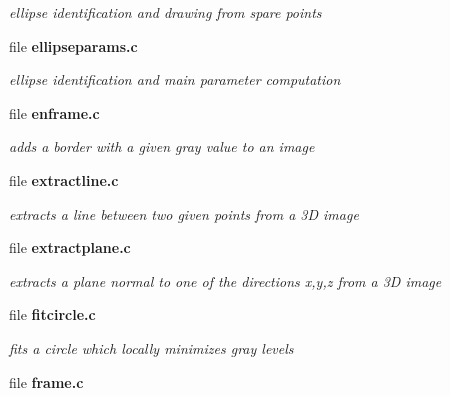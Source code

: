 \begin{DoxyCompactItemize}
\begin{DoxyCompactList}\small\item\em ellipse identification and drawing from spare points \item\end{DoxyCompactList}

\item 
file {\bf ellipseparams.c}


\begin{DoxyCompactList}\small\item\em ellipse identification and main parameter computation \item\end{DoxyCompactList}

\item 
file {\bf enframe.c}


\begin{DoxyCompactList}\small\item\em adds a border with a given gray value to an image \item\end{DoxyCompactList}

\item 
file {\bf extractline.c}


\begin{DoxyCompactList}\small\item\em extracts a line between two given points from a 3D image \item\end{DoxyCompactList}

\item 
file {\bf extractplane.c}


\begin{DoxyCompactList}\small\item\em extracts a plane normal to one of the directions x,y,z from a 3D image \item\end{DoxyCompactList}

\item 
file {\bf fitcircle.c}


\begin{DoxyCompactList}\small\item\em fits a circle which locally minimizes gray levels \item\end{DoxyCompactList}

\item 
file {\bf frame.c}



\end{DoxyCompactItemize}
